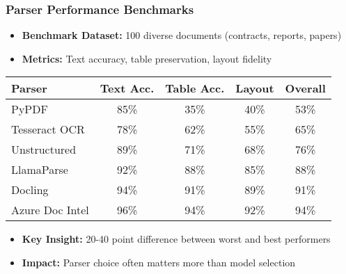\begin{frame}[fragile]\frametitle{Parser Performance Benchmarks}
      \begin{itemize}
        \item \textbf{Benchmark Dataset:} 100 diverse documents (contracts, reports, papers)
        \item \textbf{Metrics:} Text accuracy, table preservation, layout fidelity
      \end{itemize}
      
\begin{table}[h]
\centering
\small
\begin{tabular}{|l|c|c|c|c|}
\hline
\textbf{Parser} & \textbf{Text Acc.} & \textbf{Table Acc.} & \textbf{Layout} & \textbf{Overall} \\
\hline
PyPDF & 85\% & 35\% & 40\% & 53\% \\
\hline
Tesseract OCR & 78\% & 62\% & 55\% & 65\% \\
\hline
Unstructured & 89\% & 71\% & 68\% & 76\% \\
\hline
LlamaParse & 92\% & 88\% & 85\% & 88\% \\
\hline
Docling & 94\% & 91\% & 89\% & 91\% \\
\hline
Azure Doc Intel & 96\% & 94\% & 92\% & 94\% \\
\hline
\end{tabular}
\end{table}

      \begin{itemize}
        \item \textbf{Key Insight:} 20-40 point difference between worst and best performers
        \item \textbf{Impact:} Parser choice often matters more than model selection
      \end{itemize}
\end{frame}

